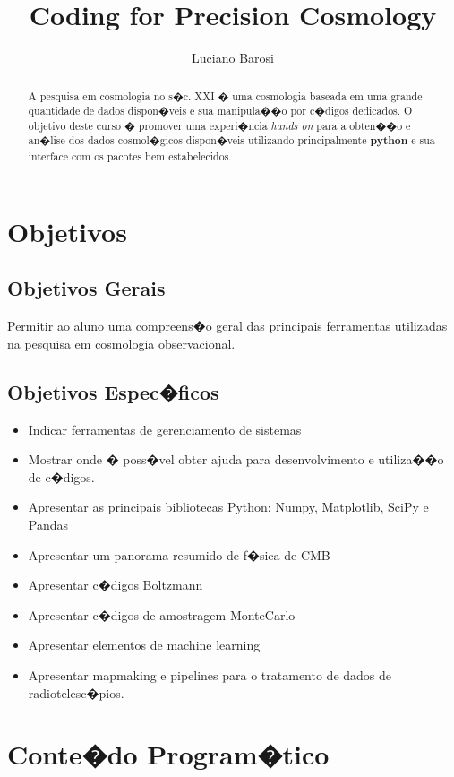\documentclass[a4paper, 11pt]{hitec}
\author{Luciano Barosi}
\title{Coding for Precision Cosmology}
\begin{document}
\maketitle

\begin{abstract}
A pesquisa em cosmologia no s�c. XXI � uma cosmologia baseada em uma grande quantidade de dados dispon�veis e sua manipula��o por c�digos dedicados. O objetivo deste curso � promover uma experi�ncia \emph{hands on} para a obten��o e an�lise dos dados cosmol�gicos dispon�veis utilizando principalmente \textbf{python} e sua interface com os pacotes bem estabelecidos.
\end{abstract}

\section{Objetivos}

\subsection{Objetivos Gerais}

Permitir ao aluno uma compreens�o geral das principais ferramentas utilizadas na pesquisa em cosmologia observacional.

\subsection{Objetivos Espec�ficos}

\begin{itemize}
	\item Indicar ferramentas de gerenciamento de sistemas
	\item Mostrar onde � poss�vel obter ajuda para desenvolvimento e utiliza��o de c�digos.
	\item Apresentar as principais bibliotecas Python: Numpy, Matplotlib, SciPy e Pandas
	\item Apresentar um panorama resumido de f�sica de CMB
	\item Apresentar c�digos Boltzmann
	\item Apresentar c�digos de amostragem MonteCarlo
	\item Apresentar elementos de machine learning
	\item Apresentar mapmaking e pipelines para o tratamento de dados de radiotelesc�pios.
\end{itemize}

\section{Conte�do Program�tico}
\end{document}
